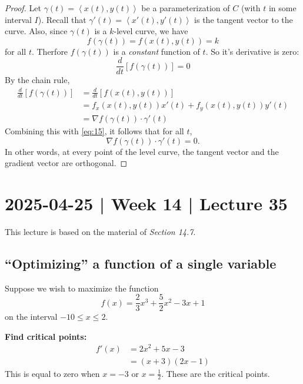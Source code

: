 \documentclass[10pt]{article}
\theoremstyle{definition}
\newcommand{\vt}{\vskip 5mm} %
\newcommand{\Fl}{\vt\noindent\textbf} %
\newcommand{\1}[1]{\textbf{1}_{\left[#1\right]}} %
\begin{document}
\begin{proof}
  Let $\gamma(t) = \left\langle x(t),y(t) \right\rangle $ be a
  parameterization of $C$ (with $t$ in some interval $I$). Recall that
  $\gamma'(t)= \left\langle x'(t),y'(t) \right\rangle $ is the tangent vector
  to the curve. Also, since $\gamma(t)$ is a $k$-level curve, we have
  \begin{equation*}
    f(\gamma(t)) = f(x(t),y(t)) = k
  \end{equation*}
  for all $t$. Therfore $f(\gamma(t))$ is a \textit{constant} function of $t$.
  So it's derivative is zero:
  \begin{equation}\label{eq:15}
    \frac{d}{dt}\left[ f(\gamma(t)) \right] = 0 
  \end{equation}
  By the chain rule,
  \begin{align*}
    \frac{d}{dt} \left[ f(\gamma(t)) \right] 
    &= \frac{d}{dt}\left[ f(x(t),y(t)) \right]\\ 
    &= f_{x}(x(t),y(t)) x'(t) + f_{y}(x(t),y(t))y'(t)\\
    &= \nabla f(\gamma(t)) \cdot\gamma'(t)
  \end{align*}
  Combining this with \cref{eq:15}, it follows that for all $t$, 
  \begin{equation*}
    \nabla f(\gamma(t)) \cdot\gamma'(t) = 0.
  \end{equation*}
  In other words, at every point of the level curve, the tangent vector and
  the gradient vector are orthogonal.
\end{proof}

\section{2025-04-25 | Week 14 | Lecture 35}
This lecture is based on the material of \textit{Section 14.7}.

\subsection{``Optimizing'' a function of a single variable}

Suppose we wish to maximize the function 
\begin{equation*}
  f(x) = \frac{2}{3}x^{3}+\frac{5}{2}x^{2}-3x+1
\end{equation*}
on the interval $-10 \leq x \leq 2$.

\Fl{Find critical points:}
\begin{align*} 
  f'(x) 
  &= 2x^{2}+5x-3 \\
  &= (x+3)(2x-1)
\end{align*}
This is equal to zero when $x=-3$ or $x=\frac{1}{2}$. These are the critical
points.
\end{document}
